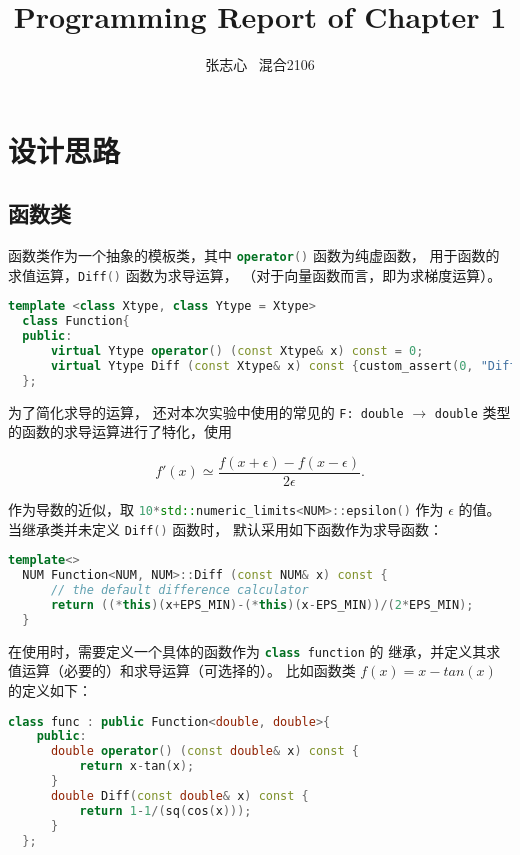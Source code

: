 \documentclass[lang=cn,a4paper,newtx,bibend=bibtex]{elegantpaper}
\title{Programming Report of Chapter 1}
\author{张志心 \ 混合2106}
\date{\zhdate{2023/09/30}}
\begin{document}
\maketitle

\section{设计思路}

\subsection{函数类}

函数类作为一个抽象的模板类，其中 \lstinline[language=C++]{operator()} 函数为纯虚函数，
用于函数的求值运算，\lstinline[language=C++]{Diff()} 函数为求导运算，
（对于向量函数而言，即为求梯度运算）。

\begin{lstlisting}[language=C++]
  template <class Xtype, class Ytype = Xtype> 
  class Function{
  public:
      virtual Ytype operator() (const Xtype& x) const = 0;
      virtual Ytype Diff (const Xtype& x) const {custom_assert(0, "Diff() has not be designed\n");}
  };
\end{lstlisting}

为了简化求导的运算，
还对本次实验中使用的常见的 \texttt{F: double} $\to$ \texttt{double}
类型的函数的求导运算进行了特化，使用

\[
  f'(x) \simeq \dfrac{f(x+\epsilon)-f(x-\epsilon)}{2\epsilon}.
\]

作为导数的近似，取 \lstinline[language=C++]{10*std::numeric_limits<NUM>::epsilon()} 
作为 $\epsilon$ 的值。当继承类并未定义 \lstinline[language=C++]{Diff()} 函数时，
默认采用如下函数作为求导函数：

\begin{lstlisting}[language=C++]
  template<>
  NUM Function<NUM, NUM>::Diff (const NUM& x) const {
      // the default difference calculator
      return ((*this)(x+EPS_MIN)-(*this)(x-EPS_MIN))/(2*EPS_MIN);
  }
\end{lstlisting}

在使用时，需要定义一个具体的函数作为 \lstinline[language=C++]{class function} 的
继承，并定义其求值运算（必要的）和求导运算（可选择的）。
比如函数类 $f(x) = x - tan(x)$ 的定义如下：

\begin{lstlisting}[language=C++]
  class func : public Function<double, double>{
    public:
      double operator() (const double& x) const {
          return x-tan(x);
      }
      double Diff(const double& x) const {
          return 1-1/(sq(cos(x)));
      }
  };
\end{lstlisting}
\end{document}
